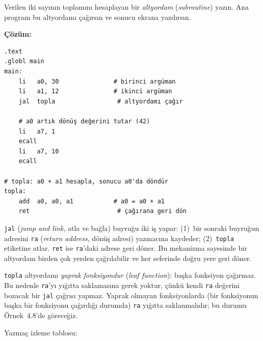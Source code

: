 \begin{ornek}[4.6]
\label{orn:altyordam-cagirma}
Verilen iki sayının toplamını hesaplayan bir \emph{altyordam} (\emph{subroutine}) yazın. Ana program bu altyordamı çağırsın ve sonucu ekrana yazdırsın.

\textbf{Çözüm:}

\begin{lstlisting}[style=riscv]
.text
.globl main
main:
    li   a0, 30               # birinci argüman
    li   a1, 12               # ikinci argüman
    jal  topla                 # altyordamı çağır

    # a0 artık dönüş değerini tutar (42)
    li   a7, 1
    ecall
    li   a7, 10
    ecall

# topla: a0 + a1 hesapla, sonucu a0'da döndür
topla:
    add  a0, a0, a1           # a0 = a0 + a1
    ret                        # çağırana geri dön
\end{lstlisting}

\texttt{jal} (\emph{jump and link}, atla ve bağla) buyruğu iki iş yapar: (1)~bir sonraki buyruğun adresini \texttt{ra} (\emph{return address}, dönüş adresi) yazmacına kaydeder; (2)~\texttt{topla} etiketine atlar. \texttt{ret} ise \texttt{ra}'daki adrese geri döner. Bu mekanizma sayesinde bir altyordam birden çok yerden çağrılabilir ve her seferinde doğru yere geri döner.

\texttt{topla} altyordamı \emph{yaprak fonksiyondur} (\emph{leaf function}): başka fonksiyon çağırmaz. Bu nedenle \texttt{ra}'yı yığıtta saklamasına gerek yoktur, çünkü kendi \texttt{ra} değerini bozacak bir \texttt{jal} çağrısı yapmaz. Yaprak olmayan fonksiyonlarda (bir fonksiyonun başka bir fonksiyonu çağırdığı durumda) \texttt{ra} yığıtta saklanmalıdır; bu durumu Örnek~4.8'de göreceğiz.

Yazmaç izleme tablosu:


\end{ornek}
